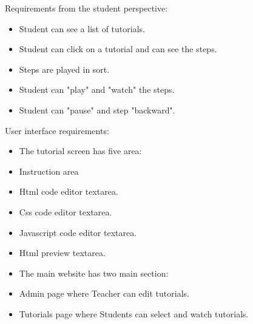 Requirements from the student perspective:
\begin{itemize}
\item Student can see a list of tutorials.
\item Student can click on a tutorial and can see the steps.
\item Steps are played in sort.
\item Student can "play" and "watch" the steps.
\item Student can "pause" and step "backward".
\end{itemize}

User interface requirements:
\begin{itemize}
\item The tutorial screen has five area:
\item Instruction area
\item Html code editor textarea.
\item Css code editor textarea.
\item Javascript code editor textarea.
\item Html preview textarea.
\item The main website has two main section:
\item Admin page where Teacher can edit tutorials.
\item Tutorials page where Students can select and watch tutorials.
\end{itemize}

